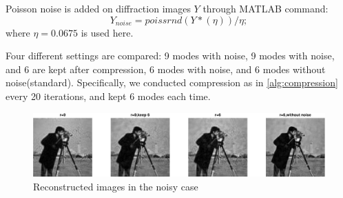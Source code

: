 \documentclass{article}
\numberwithin{equation}{section}
\begin{document}
 Poisson noise is added on diffraction images $Y$ through MATLAB command:
 $$
  Y_{noise}=poissrnd(Y*(\eta))/\eta;
 $$
 where
 $\eta=0.0675$ is used here.
 
 Four different settings are compared: 9 modes with noise, 9 modes with noise, and 6 are kept after compression, 6 modes with noise, and 6 modes without noise(standard). Specifically, we conducted compression as in \ref{alg:compression} every 20 iterations, and kept 6 modes each time.
 
 
 \begin{figure}[H]
 \centering
 \includegraphics[width=1\linewidth]{figures/noise_u.eps}
 \caption{Reconstructed images in the noisy case}
 
    \label{fig:noise_u}
 
  \end{figure}
  
\end{document}
